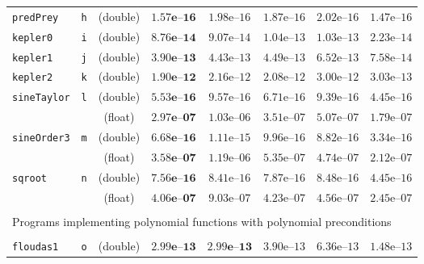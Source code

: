 \begin{tabular}{p{2.3cm}ccccccc}
\multirow{1}{*}{\texttt{predPrey}} & \texttt{h}
& (double) & $\mathbf{1.57\textbf{e--}16}$ & $1.98\text{e--}16$ & $1.87\text{e--}16$ & $2.02\text{e--}16$ & $1.47\text{e--}16$ \\
\multirow{1}{*}{\texttt{kepler0}} & \texttt{i}
& (double) & $\mathbf{8.76\textbf{e--}14}$ & $9.07\text{e--}14$ & $1.04\text{e--}13$ & $1.03\text{e--}13$ & $2.23\text{e--}14$\\
\multirow{1}{*}{\texttt{kepler1}} & \texttt{j}
& (double) & $\mathbf{3.90\textbf{e--}13}$ & $4.43\text{e--}13$ & $4.49\text{e--}13$ & $6.52\text{e--}13$ & $7.58\text{e--}14$\\
\multirow{1}{*}{\texttt{kepler2}} & \texttt{k}
& (double) & $\mathbf{1.90\textbf{e--}12}$ & $2.16\text{e--}12$ & $2.08\text{e--}12$ & $3.00\text{e--}12$ & $3.03\text{e--}13$\\
\hline
\multirow{2}{*}{\texttt{sineTaylor}} & \multirow{2}{*}{\texttt{l}}
& (double) & $\mathbf{5.53\textbf{e--}16}$ & $9.57\text{e--}16$ & $6.71\text{e--}16$ & $9.39\text{e--}16$ & $4.45\text{e--}16$\\
& & (float) & $\mathbf{2.97\textbf{e--}07}$ & $1.03\text{e--}06$ & $3.51\text{e--}07$ & $5.07\text{e--}07$ & $1.79\text{e--}07$\\
\hline 
\multirow{2}{*}{\texttt{sineOrder3}} & \multirow{2}{*}{\texttt{m}}
& (double) & $\mathbf{6.68\textbf{e--}16}$ & $1.11\text{e--}15$ & $9.96\text{e--}16$ & $8.82\text{e--}16$ & $3.34\text{e--}16$\\
& & (float) & $\mathbf{3.58\textbf{e--}07}$ & $1.19\text{e--}06$ & $5.35\text{e--}07$ & $4.74\text{e--}07$ & $2.12\text{e--}07$\\
\hline
\multirow{2}{*}{\texttt{sqroot}} & \multirow{2}{*}{\texttt{n}}
& (double) & $\mathbf{7.56\textbf{e--}16}$ & $8.41\text{e--}16$ & $7.87\text{e--}16$ & $8.48\text{e--}16$ & $4.45\text{e--}16$\\
& & (float) & $\mathbf{4.06\textbf{e--}07}$ & $9.03\text{e--}07$ & $4.23\text{e--}07$ & $4.56\text{e--}07$ & $2.45\text{e--}07$\\
\hline
\\
\multicolumn{8}{l}{Programs implementing polynomial functions with polynomial preconditions}\\
\\
\hline
\multirow{1}{*}{\texttt{floudas1}} & \texttt{o}
& (double) & $\mathbf{2.99\textbf{e--}13}$ & $\mathbf{2.99\textbf{e--}13}$ & $3.90\text{e--}13$ & $6.36\text{e--}13$ & $1.48\text{e--}13$ \\

\end{tabular}
